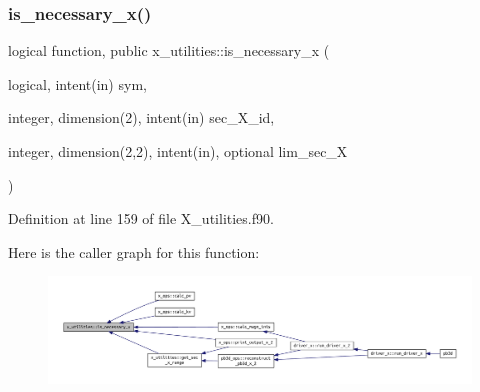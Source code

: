 \subsubsection{\texorpdfstring{is\+\_\+necessary\+\_\+x()}{is\_necessary\_x()}}
{\footnotesize\ttfamily logical function, public x\+\_\+utilities\+::is\+\_\+necessary\+\_\+x (\begin{DoxyParamCaption}\item[{logical, intent(in)}]{sym,  }\item[{integer, dimension(2), intent(in)}]{sec\+\_\+\+X\+\_\+id,  }\item[{integer, dimension(2,2), intent(in), optional}]{lim\+\_\+sec\+\_\+X }\end{DoxyParamCaption})}



Definition at line 159 of file X\+\_\+utilities.\+f90.

Here is the caller graph for this function\+:
\nopagebreak
\begin{figure}[H]
\begin{center}
\leavevmode
\includegraphics[width=350pt]{namespacex__utilities_a689aca7fedb49c43c5a65a18d557259f_icgraph}
\end{center}
\end{figure}
